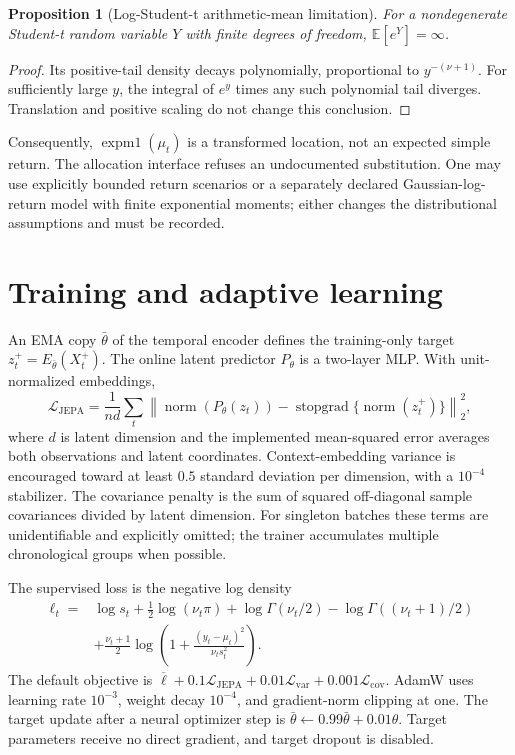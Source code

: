 \documentclass[11pt,a4paper]{article}
\newcommand{\E}{\mathbb E}
\newcommand{\sg}{\operatorname{stopgrad}}
\newtheorem{proposition}{Proposition}
\begin{document}
\begin{proposition}[Log-Student-t arithmetic-mean limitation]
For a nondegenerate Student-t random variable $Y$ with finite degrees of freedom, $\E[e^Y]=\infty$.
\end{proposition}
\begin{proof}
Its positive-tail density decays polynomially, proportional to $y^{-(\nu+1)}$. For sufficiently large $y$, the integral of $e^y$ times any such polynomial tail diverges. Translation and positive scaling do not change this conclusion.
\end{proof}
Consequently, $\operatorname{expm1}(\mu_t)$ is a transformed location, not an expected simple return. The allocation interface refuses an undocumented substitution. One may use explicitly bounded return scenarios or a separately declared Gaussian-log-return model with finite exponential moments; either changes the distributional assumptions and must be recorded.

\section{Training and adaptive learning}

An EMA copy $\bar\theta$ of the temporal encoder defines the training-only target $z_t^+=E_{\bar\theta}(X_t^+)$. The online latent predictor $P_\theta$ is a two-layer MLP. With unit-normalized embeddings,
\begin{equation}
\mathcal L_{\mathrm{JEPA}}=\frac1{nd}\sum_t\left\|\operatorname{norm}(P_\theta(z_t))-\sg\{\operatorname{norm}(z_t^+)\}\right\|_2^2,
\end{equation}
where $d$ is latent dimension and the implemented mean-squared error averages both observations and latent coordinates. Context-embedding variance is encouraged toward at least $0.5$ standard deviation per dimension, with a $10^{-4}$ stabilizer. The covariance penalty is the sum of squared off-diagonal sample covariances divided by latent dimension. For singleton batches these terms are unidentifiable and explicitly omitted; the trainer accumulates multiple chronological groups when possible.

The supervised loss is the negative log density
\begin{align}
\ell_t={}&\log s_t+\tfrac12\log(\nu_t\pi)+\log\Gamma(\nu_t/2)-\log\Gamma((\nu_t+1)/2)\\
&+\tfrac{\nu_t+1}{2}\log\left(1+\frac{(y_t-\mu_t)^2}{\nu_ts_t^2}\right).
\end{align}
The default objective is $\overline\ell+0.1\mathcal L_{\mathrm{JEPA}}+0.01\mathcal L_{\mathrm{var}}+0.001\mathcal L_{\mathrm{cov}}$. AdamW uses learning rate $10^{-3}$, weight decay $10^{-4}$, and gradient-norm clipping at one. The target update after a neural optimizer step is $\bar\theta\leftarrow0.99\bar\theta+0.01\theta$. Target parameters receive no direct gradient, and target dropout is disabled.
\end{document}
